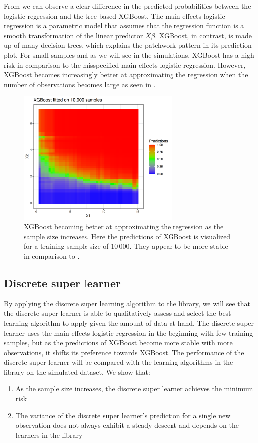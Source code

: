 \documentclass[./main.tex]{subfiles}
\begin{document}
From  we can observe a clear difference in the predicted probabilities between the logistic regression and the tree-based XGBoost. The main effects logistic regression is a parametric model that assumes that the regression function is a smooth transformation of the linear predictor $ X\beta $. XGBoost, in contrast, is made up of many decision trees, which explains the patchwork pattern in its prediction plot. For small samples and as we will see in the simulations, XGBoost has a high risk in comparison to the misspecified main effects logistic regression. However, XGBoost becomes increasingly better at approximating the regression when the number of observations becomes large as seen in . 
\begin{figure}[H]
    \centering
    \includegraphics[width=0.7\textwidth]{figures/xgboost10k.png}
    \caption{XGBoost becoming better at approximating the regression as the sample size increases. Here the predictions of XGBoost is visualized for a training sample size of $ 10\,000 $. They appear to be more stable in comparison to .}
    \label{fig:xgboost10k}
\end{figure}
\subsection{Discrete super learner} \label{sim_dsl}
By applying the discrete super learning algorithm to the library, we will see that the discrete super learner is able to qualitatively assess and select the best learning algorithm to apply given the amount of data at hand. The discrete super learner uses the main effects logistic regression in the beginning with few training samples, but as the predictions of XGBoost become more stable with more observations, it shifts its preference towards XGBoost. The performance of the discrete super learner will be compared with the learning algorithms in the library on the simulated dataset. We show that:
\begin{enumerate}
    \item As the sample size increases, the discrete super learner achieves the minimum risk 
    \item The variance of the discrete super learner's prediction for a single new observation does not always exhibit a steady descent and depends on the learners in the library
\end{enumerate}
\end{document}
